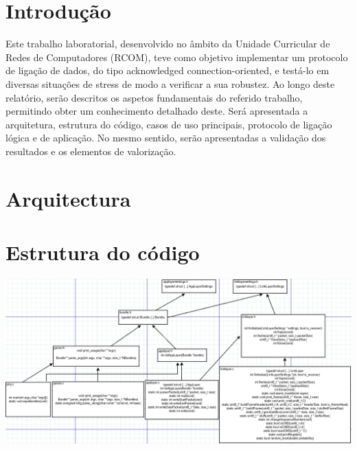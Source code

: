 \documentclass[a4paper]{article}
\begin{document}
\newpage

\section{Introdução}
Este trabalho laboratorial, desenvolvido no âmbito da Unidade Curricular de Redes de Computadores (RCOM), teve como objetivo implementar um protocolo de ligação de dados, do tipo acknowledged connection-oriented, e testá-lo em diversas situações de stress de modo a verificar a sua robustez.
Ao longo deste relatório, serão descritos os aspetos fundamentais do referido trabalho, permitindo obter um conhecimento detalhado deste. Será apresentada a arquitetura, estrutura do código, casos de uso principais, protocolo de ligação lógica e de aplicação. No mesmo sentido, serão apresentadas a validação dos resultados e os elementos de valorização.

\section{Arquitectura}

\section{Estrutura do código}
\centerline{\includegraphics[scale=0.70]{organizacaoFicheirosECodigo.png}}
\end{document}
